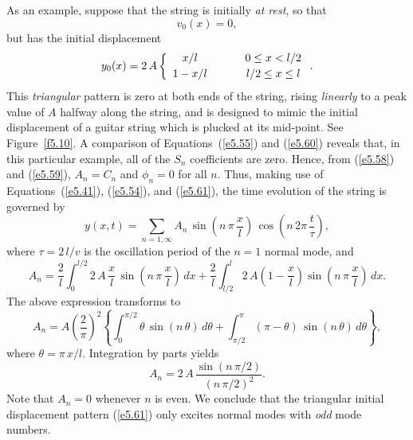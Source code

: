 As an example, suppose that the string is initially {\em at rest}, so that 
\begin{equation}
v_0(x) = 0,\label{e5.60}
\end{equation}
 but
has the initial displacement
\begin{equation}
y_0(x) = 2\,A\left\{
\begin{array}{ccc}
x/l&\mbox{\hspace{0.5cm}}&0\leq x < l/2\\[0.5ex]
1-x/l &&l/2\leq x\leq l
\end{array}
\right. .\label{e5.61}
\end{equation}
This {\em triangular}\/  pattern is zero at both ends of the string,  rising {\em linearly}\/ to a
peak value of $A$ halfway along the string, and is designed to
mimic the initial displacement of a guitar string which is plucked at its
mid-point. See Figure~\ref{f5.10}.
A comparison of Equations~(\ref{e5.55}) and (\ref{e5.60}) reveals that, in this particular example, all of the $S_n$ coefficients
are zero. Hence, from (\ref{e5.58}) and (\ref{e5.59}), $A_n = C_n$ and $\phi_n=0$
for all $n$. Thus, making use of Equations~(\ref{e5.41}),  (\ref{e5.54}), and  (\ref{e5.61}), the
time evolution of the string is governed by
\begin{equation}\label{e5.62}
y(x,t) = \sum_{n=1,\infty}A_n\,\sin\left(n\,\pi\,\frac{x}{l}\right)\,\cos\left(n\,2\pi\,\frac{t}{\tau}\right),
\end{equation}
where $\tau= 2\,l/v$ is the oscillation period of the $n=1$ normal mode, and
\begin{equation}
A_n = \frac{2}{l}\int_0^{l/2}2\,A\,\frac{x}{l}\,\sin\left(n\,\pi\,\frac{x}{l}\right)\,dx
+\frac{2}{l}\int_{l/2}^{l}2\,A\left(1-\frac{x}{l}\right)\sin\left(n\,\pi\,\frac{x}{l}\right)\,dx.
\end{equation}
The above expression transforms to
\begin{equation}
A_n = A\left(\frac{2}{\pi}\right)^2\left\{
\int_0^{\pi/2}\theta\,\sin(n\,\theta)\,d\theta + \int_{\pi/2}^\pi(\pi-\theta)\,\sin(n\,\theta)\,d\theta\right\},
\end{equation}
where $\theta=\pi\,x/l$. Integration by parts yields
\begin{equation}\label{e5.65}
A_n = 2\,A\,\frac{\sin(n\,\pi/2)}{(n\,\pi/2)^2}.
\end{equation}
Note that $A_n=0$ whenever $n$ is even. We conclude that the triangular initial displacement pattern (\ref{e5.61})  only excites normal modes with {\em odd}\/
mode numbers. 

